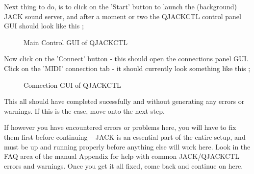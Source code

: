 \documentclass[letterpaper]{report}
\begin{document}
Next thing to do, is to click on the 'Start' button to launch the
(background) JACK sound server, and after a moment or two the QJACKCTL
control panel GUI should look like this ;


\begin{figure}
\caption{Main Control GUI of QJACKCTL}
\end{figure}


Now click on the 'Connect' button - this should open the connections
panel GUI. Click on the 'MIDI' connection tab - it should currently
look something like this ;

\begin{figure}
\caption{Connection  GUI of QJACKCTL}
\end{figure}


This all should have completed sucessfully and without generating any
errors or warnings. If this is the case, move onto the next step.


If however you have encountered errors or problems here, you will have to
fix them first before continuing -- JACK is an essential part of the
entire setup, and must be up and running properly before anything else
will work here. Look in the FAQ area of the manual Appendix for help with
common JACK/QJACKCTL errors and warnings. Once you get it all fixed, come
back and continue on here.
\end{document}
